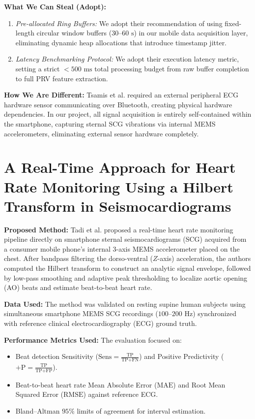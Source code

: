\textbf{What We Can Steal (Adopt):}
\begin{enumerate}
    \item \textit{Pre-allocated Ring Buffers:} We adopt their recommendation of using fixed-length circular window buffers ($30\text{--}60\text{ s}$) in our mobile data acquisition layer, eliminating dynamic heap allocations that introduce timestamp jitter.
    \item \textit{Latency Benchmarking Protocol:} We adopt their execution latency metric, setting a strict $<500\text{ ms}$ total processing budget from raw buffer completion to full PRV feature extraction.
\end{enumerate}

\textbf{How We Are Different:} Tsamis et al. required an external peripheral ECG hardware sensor communicating over Bluetooth, creating physical hardware dependencies. In our project, all signal acquisition is entirely self-contained within the smartphone, capturing sternal SCG vibrations via internal MEMS accelerometers, eliminating external sensor hardware completely.

\newpage
\section{A Real-Time Approach for Heart Rate Monitoring Using a Hilbert Transform in Seismocardiograms \cite{tadi2016realtime}}

\textbf{Proposed Method:} Tadi et al. \cite{tadi2016realtime} proposed a real-time heart rate monitoring pipeline directly on smartphone sternal seismocardiograms (SCG) acquired from a consumer mobile phone's internal 3-axis MEMS accelerometer placed on the chest. After bandpass filtering the dorso-ventral ($Z$-axis) acceleration, the authors computed the Hilbert transform to construct an analytic signal envelope, followed by low-pass smoothing and adaptive peak thresholding to localize aortic opening (AO) beats and estimate beat-to-beat heart rate.

\textbf{Data Used:} The method was validated on resting supine human subjects using simultaneous smartphone MEMS SCG recordings ($100\text{--}200\text{ Hz}$) synchronized with reference clinical electrocardiography (ECG) ground truth.

\textbf{Performance Metrics Used:} The evaluation focused on:
\begin{itemize}
    \item Beat detection Sensitivity ($\text{Sens} = \frac{\text{TP}}{\text{TP} + \text{FN}}$) and Positive Predictivity ($+\text{P} = \frac{\text{TP}}{\text{TP} + \text{FP}}$).
    \item Beat-to-beat heart rate Mean Absolute Error ($\text{MAE}$) and Root Mean Squared Error ($\text{RMSE}$) against reference ECG.
    \item Bland--Altman $95\%$ limits of agreement for interval estimation.
\end{itemize}

